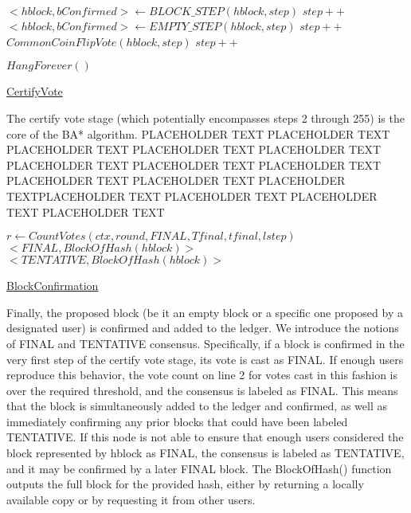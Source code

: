 \documentclass[10pt,a4paper]{article}
\begin{document}
\begin{algorithm}
    \begin{algorithmic}[1]

    {
        \\
        \State $<hblock, bConfirmed> \gets BLOCK\_STEP(hblock, step)$
        \EndIf
        \State $step++$\\
   
        \State $<hblock, bConfirmed> \gets EMPTY\_STEP(hblock,step)$
        \EndIf
        \State $step++$\\

        \State $CommonCoinFlipVote(hblock, step)$
        \State $step++$
    }
    \EndWhile

    \State $HangForever()$
    
    \EndFunction
    \end{algorithmic}
    \caption{\underline{CertifyVote}}
\end{algorithm}

The certify vote stage (which potentially encompasses steps 2 through 255) is the core of the BA* algorithm.
PLACEHOLDER TEXT PLACEHOLDER TEXT PLACEHOLDER TEXT PLACEHOLDER TEXT PLACEHOLDER TEXT
PLACEHOLDER TEXT PLACEHOLDER TEXT PLACEHOLDER TEXT PLACEHOLDER TEXT PLACEHOLDER TEXT
PLACEHOLDER TEXTPLACEHOLDER TEXT PLACEHOLDER TEXT PLACEHOLDER TEXT PLACEHOLDER TEXT


\begin{algorithm}
    \begin{algorithmic}[1]

    \State $r \gets CountVotes(ctx, round, FINAL, Tfinal, tfinal, lstep)$
    {
        \State \Return $<FINAL, BlockOfHash(hblock)>$ 
    }
    {
        \State \Return $<TENTATIVE, BlockOfHash(hblock)>$
    }
        
    \EndFunction
    \end{algorithmic}
    \caption{\underline{BlockConfirmation}}
\end{algorithm}



Finally, the proposed block (be it an empty block or a specific one proposed by a designated user) is confirmed and added to the ledger.
We introduce the notions of FINAL and TENTATIVE consensus.
Specifically, if a block is confirmed in the very first step of the certify vote stage, its vote is cast as FINAL.
If enough users reproduce this behavior, the vote count on line 2 for votes cast in this fashion is over the required threshold, and the consensus is labeled as FINAL.
This means that the block is simultaneously added to the ledger and confirmed, as well as immediately confirming any prior blocks that could have been labeled TENTATIVE.
If this node is not able to ensure that enough users considered the block represented by hblock as FINAL, the consensus is labeled as TENTATIVE, and it may be confirmed by a later FINAL block.
The BlockOfHash() function outputs the full block for the provided hash, either by returning a locally available copy or by requesting it from other users.
\end{document}
